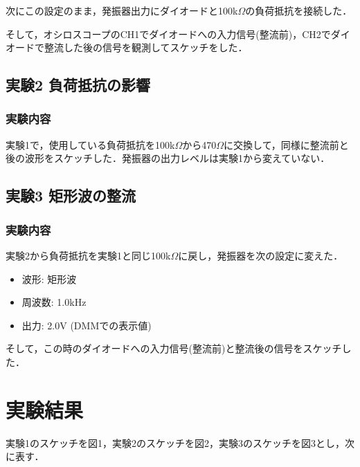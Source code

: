 \documentclass[titlepage,a4paper,11pt]{jsarticle}
\def\tightlist{\itemsep1pt\parskip0pt\parsep0pt}
\begin{document}
次にこの設定のまま，発振器出力にダイオードと100k\(\Omega\)の負荷抵抗を接続した．

そして，オシロスコープのCH1でダイオードへの入力信号(整流前)，CH2でダイオードで整流した後の信号を観測してスケッチをした．

\subsection{実験2 負荷抵抗の影響}

\subsubsection{実験内容}

実験1で，使用している負荷抵抗を100k\(\Omega\)から470\(\Omega\)に交換して，同様に整流前と後の波形をスケッチした．発振器の出力レベルは実験1から変えていない．

\subsection{実験3 矩形波の整流}

\subsubsection{実験内容}

実験2から負荷抵抗を実験1と同じ100k\(\Omega\)に戻し，発振器を次の設定に変えた．

\begin{itemize}
    \tightlist
  \item
    波形: 矩形波
  \item
    周波数: 1.0kHz
  \item
    出力: 2.0V (DMMでの表示値)
\end{itemize}

そして，この時のダイオードへの入力信号(整流前)と整流後の信号をスケッチした．

\section{実験結果}
実験1のスケッチを図1，実験2のスケッチを図2，実験3のスケッチを図3とし，次に表す．
\end{document}
